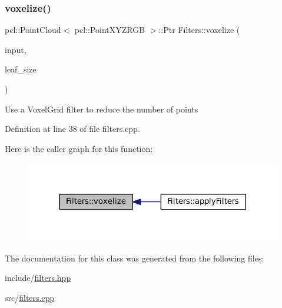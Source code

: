 \subsubsection{\texorpdfstring{voxelize()}{voxelize()}}
{\footnotesize\ttfamily pcl\+::\+Point\+Cloud$<$ pcl\+::\+Point\+X\+Y\+Z\+R\+GB $>$\+::Ptr Filters\+::voxelize (\begin{DoxyParamCaption}\item[{const pcl\+::\+Point\+Cloud$<$ pcl\+::\+Point\+X\+Y\+Z\+R\+GB $>$\+::Ptr \&}]{input,  }\item[{float}]{leaf\+\_\+size }\end{DoxyParamCaption})}

Use a Voxel\+Grid filter to reduce the number of points 

Definition at line 38 of file filters.\+cpp.

Here is the caller graph for this function\+:
\nopagebreak
\begin{figure}[H]
\begin{center}
\leavevmode
\includegraphics[width=317pt]{class_filters_a0435083e1ecca7c1a3d8883f241c4225_icgraph}
\end{center}
\end{figure}


The documentation for this class was generated from the following files\+:\begin{DoxyCompactItemize}
\item 
include/\hyperlink{filters_8hpp}{filters.\+hpp}\item 
src/\hyperlink{filters_8cpp}{filters.\+cpp}\end{DoxyCompactItemize}
